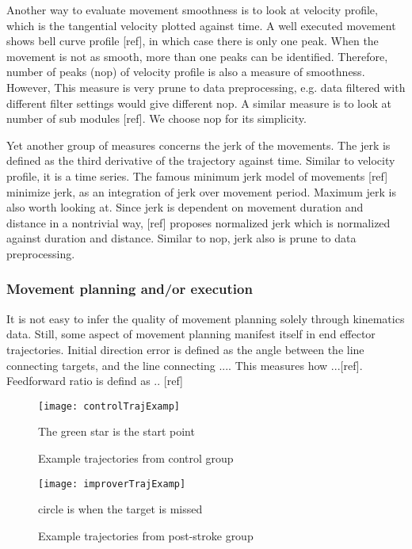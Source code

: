 Another way to evaluate movement smoothness is to look at velocity profile, which is the tangential velocity plotted against time. A well executed movement shows bell curve profile [ref], in which case there is only one peak. When the movement is not as smooth, more than one peaks can be identified. Therefore, number of peaks (nop) of velocity profile is also a measure of smoothness. However, This measure is very prune to data preprocessing, e.g. data filtered with different filter settings would give different nop. A similar measure is to look at number of sub modules [ref]. We choose nop for its simplicity.

Yet another group of measures concerns the jerk of the movements. The jerk is defined as the third derivative of the trajectory against time. Similar to velocity profile, it is a time series. The famous minimum jerk model of movements [ref] minimize jerk, as an integration of jerk over movement period. Maximum jerk is also worth looking at. Since jerk is dependent on movement duration and distance in a nontrivial way, [ref] proposes normalized jerk which is normalized against duration and distance. Similar to nop, jerk also is prune to data preprocessing.

\subsubsection{Movement planning and/or execution}
It is not easy to infer the quality of movement planning solely through kinematics data. Still, some aspect of movement planning manifest itself in end effector trajectories. Initial direction error is defined as the angle between the line connecting targets, and the line connecting .... This measures how ...[ref]. Feedforward ratio is defind as .. [ref]




\begin{figure}
	\texttt{[image: controlTrajExamp]}
	\centering
	\caption{Example trajectories from control group}
	\medskip
	\small The green star is the start point
	\label{fig:controlTrajExamp}
\end{figure}

\begin{figure}
	\texttt{[image: improverTrajExamp]}
	\centering
	\caption{Example trajectories from post-stroke group}
	\medskip
	\small circle is when the target is missed
	\label{fig:improverTrajExamp}
\end{figure}

